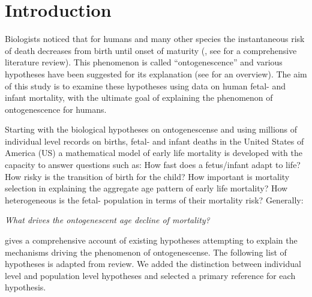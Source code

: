\documentclass[12pt, parskip=half]{scrartcl}
\begin{document}
\clearpage


\section{Introduction} %
\label{sec:introduction}

Biologists noticed that for humans and many other species the instantaneous risk of death decreases from birth until onset of maturity (\cite{Medawar1952}, see \cite{Levitis2011} for a comprehensive literature review). This phenomenon is called \enquote{ontogenescence} and various hypotheses have been suggested for its explanation (see \cite{Levitis2011} for an overview). The aim of this study is to examine these hypotheses using data on human fetal- and infant mortality, with the ultimate goal of explaining the phenomenon of ontogenescence for humans.

Starting with the biological hypotheses on ontogenescense and using millions of individual level records on births, fetal- and infant deaths in the United States of America (US) a mathematical model of early life mortality is developed with the capacity to answer questions such as: How fast does a fetus/infant adapt to life? How risky is the transition of birth for the child? How important is mortality selection in explaining the aggregate age pattern of early life mortality? How heterogeneous is the fetal- population in terms of their mortality risk? Generally:

\begin{center}
  \emph{What drives the ontogenescent age decline of mortality?}
\end{center}

\cite{Levitis2011} gives a comprehensive account of existing hypotheses attempting to explain the mechanisms driving the phenomenon of ontogenescense. The following list of hypotheses is adapted from \citeauthor{Levitis2011} review. We added the distinction between individual level and population level hypotheses and selected a primary reference for each hypothesis.
\end{document}
